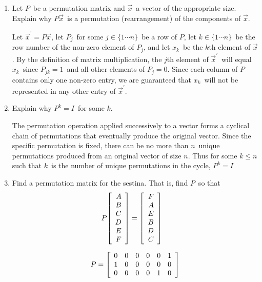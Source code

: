 \documentclass{letter}
\newcommand{\Vn}[1]{\vec{#1}}
\newcommand{\?}{\stackrel{?}{=}}
\newcommand\Que[1]{%
   \leavevmode\noindent
   #1
}
\newcommand\Ans[2][]{%
   \leavevmode\noindent
   {
       \begin{mdframed}[backgroundcolor=blue!10]
       #2
       \end{mdframed}
   }
}
\newenvironment{Mat}[1]{%
  \left[\begin{array}{*{#1}{r}}
}{%
  \end{array}\right]
}
\begin{document}
\begin{enumerate}
\begin{enumerate}[label=(\alph*)]
{    }
    \item \Que{
        Let $P$\ be a permutation matrix and $\Vn{x}$\ a vector of the appropriate size.  Explain why $P\Vn{x}$\ is a permutation (rearrangement) of the components of $\Vn{x}$.
    }
    \Ans{
        Let $\Vn{x}^\prime=P\Vn{x}$, let $P_j$\ for some $j\in \{1\cdots n\}$\ be a row of $P$, let $k\in\{1\cdots n\}$\ be the row number of the non-zero element of $P_j$, and let $x_k$\ be the $k$th element of $\Vn{x}$.  By the definition of matrix multiplication, the $j$th element of $\Vn{x}^\prime$\ will equal $x_k$\ since $P_{jk}=1$\ and all other elements of $P_j=0$.  Since each column of $P$ contains only one non-zero entry, we are guaranteed that $x_k$\ will not be represented in any other entry of $\Vn{x}^\prime$.
    }
    \newpage
    \item \Que{
        Explain why $P^k=I$\ for some $k$.
    }
    \Ans{
       The permutation operation applied successively to a vector forms a cyclical chain of permutations that eventually produce the original vector.  Since the specific permutation is fixed,  there can be no more than $n$\ unique permutations produced from an original vector of size $n$.  Thus for some $k\leq n$ such that $k$\ is the number of unique permutations in the cycle, $P^k=I$\ 
    }
    \item \Que{
      Find a permutation matrix for the sestina.  That is, find $P$\ so that
      \begin{align*}
          P\begin{Mat}{1} A\\B\\C\\D\\E\\F \end{Mat} &= \begin{Mat}{1} F\\A\\E\\B\\D\\C \end{Mat}
      \end{align*}
    }
    \Ans{
    \begin{align*}
      P = \begin{Mat}{6} 0 & 0 & 0 & 0 & 0 & 1 \\
                         1 & 0 & 0 & 0 & 0 & 0 \\
                         0 & 0 & 0 & 0 & 1 & 0 \\

\end{Mat}
\end{align*}}
\end{enumerate}
\end{enumerate}
\end{document}

